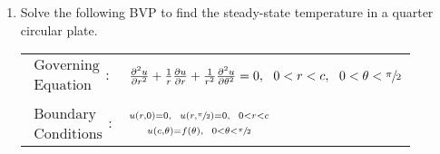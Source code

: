 \begin{fullwidth}
\begin{enumerate}
\item Solve the following BVP to find the steady-state temperature in a quarter circular plate.
\begin{table}[h]
\begin{tabular}{l l}
$\substack{\text{Governing} \\\text{Equation}}: $& $\frac{\partial^2 u}{\partial r^2} + \frac{1}{r}\frac{\partial u}{\partial r} + \frac{1}{r^2}\frac{\partial^2 u}{\partial \theta^2}= 0, \ \ 0<r<c, \ \ 0<\theta< \sfrac{\pi}{2} $\\
& \\
$\substack{\text{Boundary} \\ \text{Conditions}}: $ & $\substack{u(r,0) = 0, \ \ u(r,\sfrac{\pi}{2}) = 0, \ \ 0<r<c \\ \\ u(c,\theta) = f(\theta), \ \ 0 < \theta < \sfrac{\pi}{2} }$\\
\end{tabular}
\end{table} 

\end{enumerate}
\end{fullwidth}





